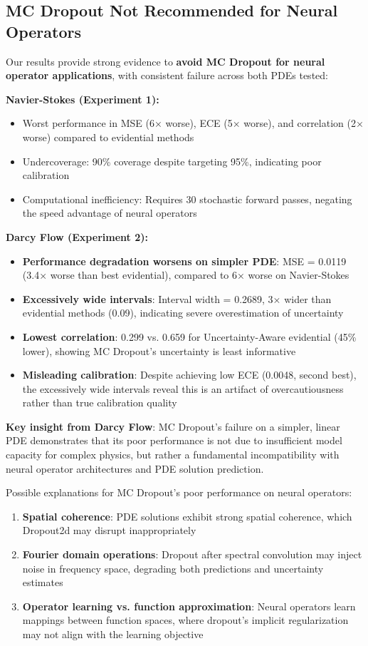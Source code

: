 \subsection{MC Dropout Not Recommended for Neural Operators}

Our results provide strong evidence to \textbf{avoid MC Dropout for neural operator applications}, with consistent failure across both PDEs tested:

\textbf{Navier-Stokes (Experiment 1):}
\begin{itemize}
\item Worst performance in MSE (6× worse), ECE (5× worse), and correlation (2× worse) compared to evidential methods
\item Undercoverage: 90\% coverage despite targeting 95\%, indicating poor calibration
\item Computational inefficiency: Requires 30 stochastic forward passes, negating the speed advantage of neural operators
\end{itemize}

\textbf{Darcy Flow (Experiment 2):}
\begin{itemize}
\item \textbf{Performance degradation worsens on simpler PDE}: MSE = 0.0119 (3.4× worse than best evidential), compared to 6× worse on Navier-Stokes
\item \textbf{Excessively wide intervals}: Interval width = 0.2689, 3× wider than evidential methods (0.09), indicating severe overestimation of uncertainty
\item \textbf{Lowest correlation}: 0.299 vs. 0.659 for Uncertainty-Aware evidential (45\% lower), showing MC Dropout's uncertainty is least informative
\item \textbf{Misleading calibration}: Despite achieving low ECE (0.0048, second best), the excessively wide intervals reveal this is an artifact of overcautiousness rather than true calibration quality
\end{itemize}

\textbf{Key insight from Darcy Flow}: MC Dropout's failure on a simpler, linear PDE demonstrates that its poor performance is not due to insufficient model capacity for complex physics, but rather a fundamental incompatibility with neural operator architectures and PDE solution prediction.

Possible explanations for MC Dropout's poor performance on neural operators:
\begin{enumerate}
\item \textbf{Spatial coherence}: PDE solutions exhibit strong spatial coherence, which Dropout2d may disrupt inappropriately
\item \textbf{Fourier domain operations}: Dropout after spectral convolution may inject noise in frequency space, degrading both predictions and uncertainty estimates
\item \textbf{Operator learning vs. function approximation}: Neural operators learn mappings between function spaces, where dropout's implicit regularization may not align with the learning objective
\end{enumerate}

